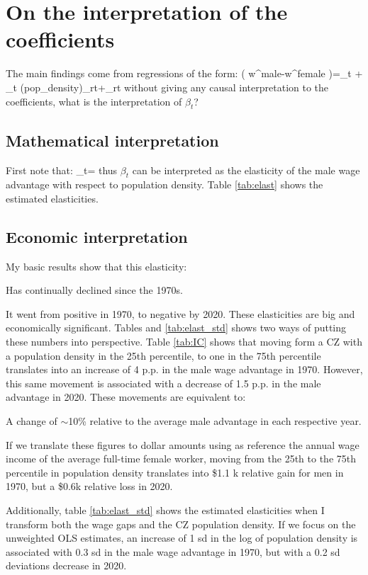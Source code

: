 \section{On the interpretation of the coefficients}

The main findings come from regressions of the form:
\beqns
 \ln \left( w^{male}-w^{female} \right)=\alpha_t + \beta_t \ln(pop\_density)_{rt}+\epsilon_{rt}
\eeqns
without giving any causal interpretation to the coefficients, what is the interpretation of $\beta_t$?

\subsection{Mathematical interpretation}
First note that:
\beqns
	\beta_t=
\eeqns
thus $\beta_t$ can be interpreted as the elasticity of the male wage advantage with respect to population density. Table \ref{tab:elast} shows the estimated elasticities.




\subsection{Economic interpretation}
My basic results show that this elasticity:
\bitem
	\item Has continually declined since the 1970s.
	\item It went from positive in 1970, to negative by 2020. 
\eitem
These elasticities are big and economically significant. Tables and \ref{tab:elast_std} shows two ways of putting these numbers into perspective. Table \ref{tab:IC} shows that moving form a CZ with a population density in the 25th percentile, to one in the 75th percentile translates into an increase of 4 p.p. in the male wage advantage in 1970. However, this same movement is associated with a decrease of 1.5 p.p. in the male advantage in 2020. These movements are equivalent to:
\bitem
	\item A change of $\sim$10\% relative to the average male advantage in each respective year.
	\item If we translate these figures to dollar amounts using as reference the annual wage income of the average full-time female worker, moving from the 25th to the 75th percentile in population density translates into \$1.1 k relative gain for men in 1970, but a \$0.6k relative loss in 2020.
\eitem

Additionally, table  \ref{tab:elast_std} shows the estimated elasticities when I transform both the wage gaps and the CZ population density. If we focus on the unweighted OLS estimates, an increase of 1 sd in the log of population density is associated with 0.3 sd in the male wage advantage in 1970, but with a 0.2 sd deviations decrease in 2020.





